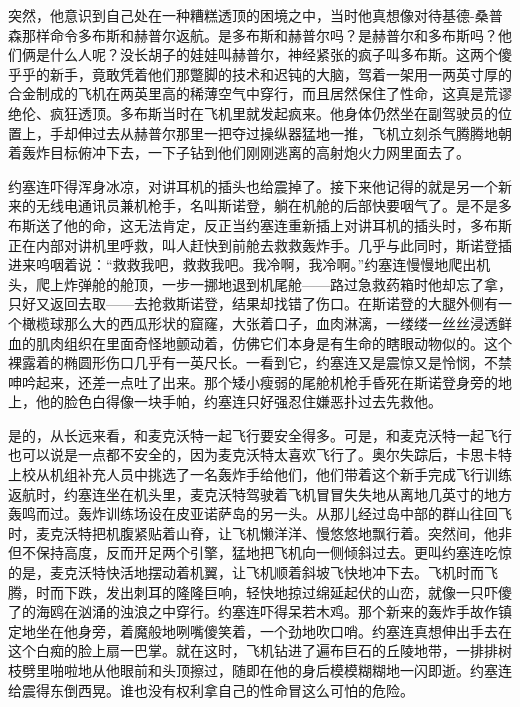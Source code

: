  


    突然，他意识到自己处在一种糟糕透顶的困境之中，当时他真想像对待基德-桑普森那样命令多布斯和赫普尔返航。是多布斯和赫普尔吗？是赫普尔和多布斯吗？他们俩是什么人呢？没长胡子的娃娃叫赫普尔，神经紧张的疯子叫多布斯。这两个傻乎乎的新手，竟敢凭着他们那蹩脚的技术和迟钝的大脑，驾着一架用一两英寸厚的合金制成的飞机在两英里高的稀薄空气中穿行，而且居然保住了性命，这真是荒谬绝伦、疯狂透顶。多布斯当时在飞机里就发起疯来。他身体仍然坐在副驾驶员的位置上，手却伸过去从赫普尔那里一把夺过操纵器猛地一推，飞机立刻杀气腾腾地朝着轰炸目标俯冲下去，一下子钻到他们刚刚逃离的高射炮火力网里面去了。

    约塞连吓得浑身冰凉，对讲耳机的插头也给震掉了。接下来他记得的就是另一个新来的无线电通讯员兼机枪手，名叫斯诺登，躺在机舱的后部快要咽气了。是不是多布斯送了他的命，这无法肯定，反正当约塞连重新插上对讲耳机的插头时，多布斯正在内部对讲机里呼救，叫人赶快到前舱去救救轰炸手。几乎与此同时，斯诺登插进来呜咽着说：“救救我吧，救救我吧。我冷啊，我冷啊。”约塞连慢慢地爬出机头，爬上炸弹舱的舱顶，一步一挪地退到机尾舱——路过急救药箱时他却忘了拿，只好又返回去取——去抢救斯诺登，结果却找错了伤口。在斯诺登的大腿外侧有一个橄榄球那么大的西瓜形状的窟窿，大张着口子，血肉淋漓，一缕缕一丝丝浸透鲜血的肌肉组织在里面奇怪地颤动着，仿佛它们本身是有生命的瞎眼动物似的。这个裸露着的椭圆形伤口几乎有一英尺长。一看到它，约塞连又是震惊又是怜悯，不禁呻吟起来，还差一点吐了出来。那个矮小瘦弱的尾舱机枪手昏死在斯诺登身旁的地上，他的脸色白得像一块手帕，约塞连只好强忍住嫌恶扑过去先救他。

    是的，从长远来看，和麦克沃特一起飞行要安全得多。可是，和麦克沃特一起飞行也可以说是一点都不安全的，因为麦克沃特太喜欢飞行了。奥尔失踪后，卡思卡特上校从机组补充人员中挑选了一名轰炸手给他们，他们带着这个新手完成飞行训练返航时，约塞连坐在机头里，麦克沃特驾驶着飞机冒冒失失地从离地几英寸的地方轰鸣而过。轰炸训练场设在皮亚诺萨岛的另一头。从那儿经过岛中部的群山往回飞时，麦克沃特把机腹紧贴着山脊，让飞机懒洋洋、慢悠悠地飘行着。突然间，他非但不保持高度，反而开足两个引擎，猛地把飞机向一侧倾斜过去。更叫约塞连吃惊的是，麦克沃特快活地摆动着机翼，让飞机顺着斜坡飞快地冲下去。飞机时而飞腾，时而下跌，发出刺耳的隆隆巨响，轻快地掠过绵延起伏的山峦，就像一只吓傻了的海鸥在汹涌的浊浪之中穿行。约塞连吓得呆若木鸡。那个新来的轰炸手故作镇定地坐在他身旁，着魔般地咧嘴傻笑着，一个劲地吹口哨。约塞连真想伸出手去在这个白痴的脸上扇一巴掌。就在这时，飞机钻进了遍布巨石的丘陵地带，一排排树枝劈里啪啦地从他眼前和头顶擦过，随即在他的身后模模糊糊地一闪即逝。约塞连给震得东倒西晃。谁也没有权利拿自己的性命冒这么可怕的危险。

 


